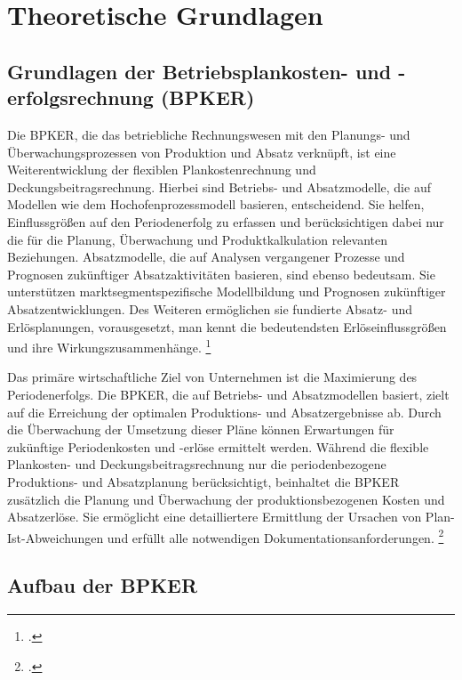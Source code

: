 \chapter{Theoretische Grundlagen}

\section{Grundlagen der Betriebsplankosten- und -erfolgsrechnung (BPKER)}

Die BPKER, die das betriebliche Rechnungswesen mit den Planungs- und Überwachungsprozessen von Produktion und Absatz verknüpft, ist eine Weiterentwicklung der flexiblen Plankostenrechnung und Deckungsbeitragsrechnung. Hierbei sind Betriebs- und Absatzmodelle, die auf Modellen wie dem Hochofenprozessmodell basieren, entscheidend. Sie helfen, Einflussgrö{\ss}en auf den Periodenerfolg zu erfassen und berücksichtigen dabei nur die für die Planung, Überwachung und Produktkalkulation relevanten Beziehungen. Absatzmodelle, die auf Analysen vergangener Prozesse und Prognosen zukünftiger Absatzaktivitäten basieren, sind ebenso bedeutsam. Sie unterstützen marktsegmentspezifische Modellbildung und Prognosen zukünftiger Absatzentwicklungen. Des Weiteren ermöglichen sie fundierte Absatz- und Erlösplanungen, vorausgesetzt, man kennt die bedeutendsten Erlöseinflussgrö{\ss}en und ihre Wirkungszusammenhänge. \footcite[Vgl.][S. 295f]{Artikel_orginal}

Das primäre wirtschaftliche Ziel von Unternehmen ist die Maximierung des Periodenerfolgs. Die BPKER, die auf Betriebs- und Absatzmodellen basiert, zielt auf die Erreichung der optimalen Produktions- und Absatzergebnisse ab. Durch die Überwachung der Umsetzung dieser Pläne können Erwartungen für zukünftige Periodenkosten und -erlöse ermittelt werden. Während die flexible Plankosten- und Deckungsbeitragsrechnung nur die periodenbezogene Produktions- und Absatzplanung berücksichtigt, beinhaltet die BPKER zusätzlich die Planung und Überwachung der produktionsbezogenen Kosten und Absatzerlöse. Sie ermöglicht eine detailliertere Ermittlung der Ursachen von Plan-Ist-Abweichungen und erfüllt alle notwendigen Dokumentationsanforderungen. \footcite[Vgl.][]{Artikel_orginal}

\section{Aufbau der BPKER}

